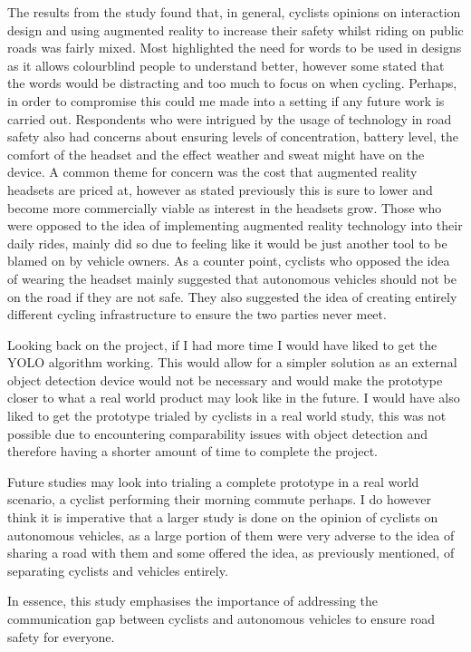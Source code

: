 \documentclass{l4proj}
\begin{document}
The results from the study found that, in general, cyclists opinions on interaction design and using augmented reality to increase their safety whilst riding on public roads was fairly mixed. Most highlighted the need for words to be used in designs as it allows colourblind people to understand better, however some stated that the words would be distracting and too much to focus on when cycling. Perhaps, in order to compromise this could me made into a setting if any future work is carried out. Respondents who were intrigued by the usage of technology in road safety also had concerns about ensuring levels of concentration, battery level, the comfort of the headset and the effect weather and sweat might have on the device. A common theme for concern was the cost that augmented reality headsets are priced at, however as stated previously this is sure to lower and become  more commercially viable as interest in the headsets grow. Those who were opposed to the idea of implementing augmented reality technology into their daily rides, mainly did so due to feeling like it would be just another tool to be blamed on by vehicle owners. As a counter point, cyclists who opposed the idea of wearing the headset mainly suggested that autonomous vehicles should not be on the road if they are not safe. They also suggested the idea of creating entirely different cycling infrastructure to ensure the two parties never meet.

Looking back on the project, if I had more time I would have liked to get the YOLO algorithm working. This would allow for a simpler solution as an external object detection device would not be necessary and would make the prototype closer to what a real world product may look like in the future. I would have also liked to get the prototype trialed by cyclists in a real world study, this was not possible due to encountering comparability issues with object detection and therefore having a shorter amount of time to complete the project.

Future studies may look into trialing a complete prototype in a real world scenario, a cyclist performing their morning commute perhaps. I do however think it is imperative that a larger study is done on the opinion of cyclists on autonomous vehicles, as a large portion of them were very adverse to the idea of sharing a road with them and some offered the idea, as previously mentioned, of separating cyclists and vehicles entirely.

In essence, this study emphasises the importance of addressing the communication gap between cyclists and autonomous vehicles to ensure road safety for everyone.
\end{document}

